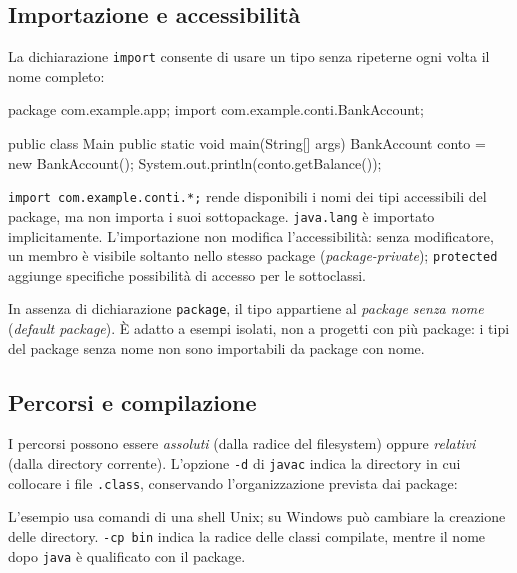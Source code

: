 \subsection{Importazione e accessibilità}
\label{sec:fi-java-file-package-struttura}

La dichiarazione \texttt{import} consente di usare un tipo senza
ripeterne ogni volta il nome completo:

\begin{unipdcode}[language=Java]
package com.example.app;
import com.example.conti.BankAccount;

public class Main {
    public static void main(String[] args) {
        BankAccount conto = new BankAccount();
        System.out.println(conto.getBalance());
    }
}
\end{unipdcode}

\texttt{import com.example.conti.*;} rende disponibili i nomi dei
tipi accessibili del package, ma non importa i suoi sottopackage.
\texttt{java.lang} è importato implicitamente. L'importazione non
modifica l'accessibilità: senza modificatore, un membro è visibile
soltanto nello stesso package (\emph{package-private});
\texttt{protected} aggiunge specifiche possibilità di accesso per
le sottoclassi.

In assenza di dichiarazione \texttt{package}, il tipo appartiene al
\emph{package senza nome} (\emph{default package}). È adatto a
esempi isolati, non a progetti con più package: i tipi del package
senza nome non sono importabili da package con nome.

\subsection{Percorsi e compilazione}
\label{sec:fi-java-file-package-compilazione}

I percorsi possono essere \emph{assoluti} (dalla radice del
filesystem) oppure \emph{relativi} (dalla directory corrente).
L'opzione \texttt{-d} di \texttt{javac} indica la directory in cui
collocare i file \texttt{.class}, conservando l'organizzazione
prevista dai package:


L'esempio usa comandi di una shell Unix; su Windows può cambiare
la creazione delle directory. \texttt{-cp bin} indica la radice
delle classi compilate, mentre il nome dopo \texttt{java} è
qualificato con il package.


